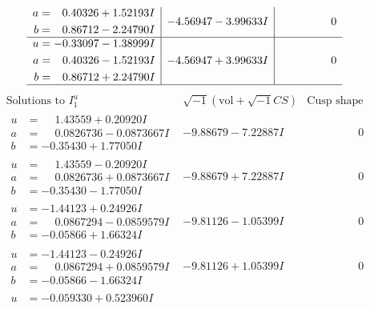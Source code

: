\documentclass[1p]{elsarticle_modified}
\theoremstyle{definition}
\newcommand{\I}{\sqrt{-1}}
\begin{document}
$$\begin{array}{c|c|c}
\begin{aligned}
a &= \phantom{-}0.40326 + 1.52193 I \\
b &= \phantom{-}0.86712 - 2.24790 I\end{aligned}
 & -4.56947 - 3.99633 I & \phantom{-0.000000 } 0 \\ \hline\begin{aligned}
u &= -0.33097 - 1.38999 I \\
a &= \phantom{-}0.40326 - 1.52193 I \\
b &= \phantom{-}0.86712 + 2.24790 I\end{aligned}
 & -4.56947 + 3.99633 I & \phantom{-0.000000 } 0\\
 \hline 
 \end{array}$$\newpage$$\begin{array}{c|c|c}  
\text{Solutions to }I^u_{1}& \I (\text{vol} + \sqrt{-1}CS) & \text{Cusp shape}\\
 \hline 
\begin{aligned}
u &= \phantom{-}1.43559 + 0.20920 I \\
a &= \phantom{-}0.0826736 - 0.0873667 I \\
b &= -0.35430 + 1.77050 I\end{aligned}
 & -9.88679 - 7.22887 I & \phantom{-0.000000 } 0 \\ \hline\begin{aligned}
u &= \phantom{-}1.43559 - 0.20920 I \\
a &= \phantom{-}0.0826736 + 0.0873667 I \\
b &= -0.35430 - 1.77050 I\end{aligned}
 & -9.88679 + 7.22887 I & \phantom{-0.000000 } 0 \\ \hline\begin{aligned}
u &= -1.44123 + 0.24926 I \\
a &= \phantom{-}0.0867294 - 0.0859579 I \\
b &= -0.05866 + 1.66324 I\end{aligned}
 & -9.81126 - 1.05399 I & \phantom{-0.000000 } 0 \\ \hline\begin{aligned}
u &= -1.44123 - 0.24926 I \\
a &= \phantom{-}0.0867294 + 0.0859579 I \\
b &= -0.05866 - 1.66324 I\end{aligned}
 & -9.81126 + 1.05399 I & \phantom{-0.000000 } 0 \\ \hline\begin{aligned}
u &= -0.059330 + 0.523960 I \\

\end{aligned}
\end{array}$$
\end{document}
